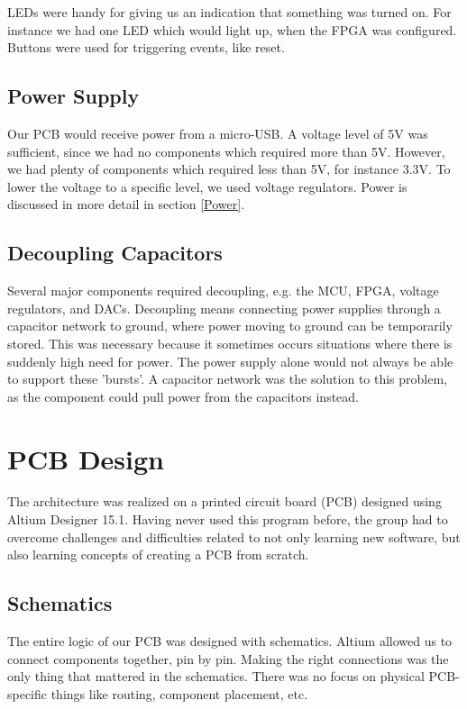LEDs were handy for giving us an indication that something was turned on. For instance we had one LED which would light up, when the FPGA was configured.
Buttons were used for triggering events, like reset.

\subsection{Power Supply}
Our PCB would receive power from a micro-USB. A voltage level of 5V was sufficient, since we had no components which required more than 5V. However, we had plenty of components which required less than 5V, for instance 3.3V. To lower the voltage to a specific level, we used voltage regulators. Power is discussed in more detail in section \ref{Power}.

\subsection{Decoupling Capacitors}
Several major components required decoupling, e.g. the MCU, FPGA, voltage regulators, and DACs.
Decoupling means connecting power supplies through a capacitor network to ground, where power moving to ground can be temporarily stored.
This was necessary because it sometimes occurs situations where there is suddenly high need for power.
The power supply alone would not always be able to support these 'bursts'.
A capacitor network was the solution to this problem, as the component could pull power from the capacitors instead.

\section{PCB Design}
The architecture was realized on a printed circuit board (PCB) designed using Altium Designer 15.1.
Having never used this program before, the group had to overcome  challenges and difficulties related to not only learning new software, but also learning concepts of creating a PCB from scratch. 

\subsection{Schematics}
The entire logic of our PCB was designed with schematics. Altium allowed us to connect components together, pin by pin. Making the right connections was the only thing that mattered in the schematics. There was no focus on physical PCB-specific things like routing, component placement, etc.

